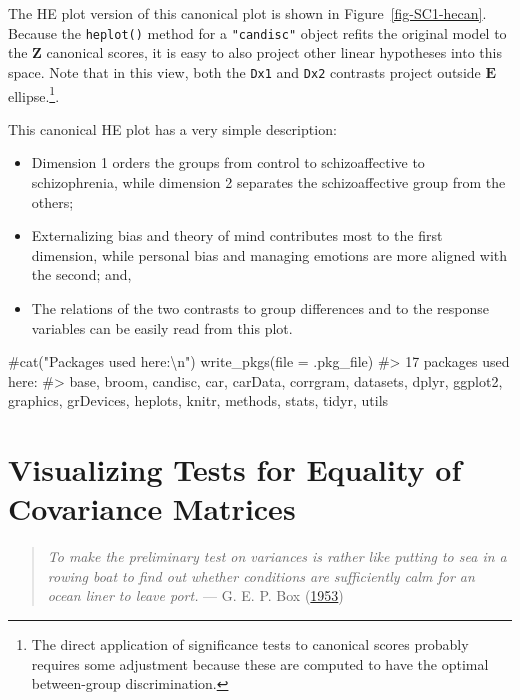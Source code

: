 \documentclass[
  letterpaper,
  10pt,
  krantz2]{krantz}
\makeatletter
\newenvironment{Shaded}{\begin{snugshade}}{\end{snugshade}}
\newcommand{\AttributeTok}[1]{\textcolor[rgb]{0.40,0.45,0.13}{#1}}
\newcommand{\CommentTok}[1]{\textcolor[rgb]{0.37,0.37,0.37}{#1}}
\newcommand{\FunctionTok}[1]{\textcolor[rgb]{0.28,0.35,0.67}{#1}}
\newcommand{\NormalTok}[1]{\textcolor[rgb]{0.00,0.23,0.31}{#1}}
\providecommand{\tightlist}{%
  \setlength{\itemsep}{0pt}\setlength{\parskip}{0pt}}\usepackage{longtable,booktabs,array}
\newenvironment{kframe}{%
  \medskip{}
  \setlength{\fboxsep}{.8em}
  \def\at@end@of@kframe{}%
  \ifinner\ifhmode%
  \def\at@end@of@kframe{\end{minipage}}%
  \begin{minipage}{\columnwidth}%
  \fi\fi%
  \def\FrameCommand##1{\hskip\@totalleftmargin \hskip-\fboxsep
  \colorbox{shadecolor}{##1}\hskip-\fboxsep
      \hskip-\linewidth \hskip-\@totalleftmargin \hskip\columnwidth}%
  \MakeFramed {\advance\hsize-\width
    \@totalleftmargin\z@ \linewidth\hsize
    \@setminipage}}%
{\par\unskip\endMakeFramed%
  \at@end@of@kframe}
\renewenvironment{Shaded}{\begin{kframe}}{\end{kframe}}
\makeatother
\begin{document}
The HE plot version of this canonical plot is shown in
Figure~\ref{fig-SC1-hecan}. Because the \texttt{heplot()} method for a
\texttt{"candisc"} object refits the original model to the
\(\mathbf{Z}\) canonical scores, it is easy to also project other linear
hypotheses into this space. Note that in this view, both the
\texttt{Dx1} and \texttt{Dx2} contrasts project outside \(\mathbf{E}\)
ellipse.\footnote{The direct application of significance tests to
  canonical scores probably requires some adjustment because these are
  computed to have the optimal between-group discrimination.}.

This canonical HE plot has a very simple description:

\begin{itemize}
\tightlist
\item
  Dimension 1 orders the groups from control to schizoaffective to
  schizophrenia, while dimension 2 separates the schizoaffective group
  from the others;
\item
  Externalizing bias and theory of mind contributes most to the first
  dimension, while personal bias and managing emotions are more aligned
  with the second; and,
\item
  The relations of the two contrasts to group differences and to the
  response variables can be easily read from this plot.
\end{itemize}

\begin{Shaded}
\begin{Highlighting}[]
\CommentTok{\#cat("Packages used here:\textbackslash{}n")}
\FunctionTok{write\_pkgs}\NormalTok{(}\AttributeTok{file =}\NormalTok{ .pkg\_file)}
\CommentTok{\#\textgreater{} 17  packages used here:}
\CommentTok{\#\textgreater{}  base, broom, candisc, car, carData, corrgram, datasets, dplyr, ggplot2, graphics, grDevices, heplots, knitr, methods, stats, tidyr, utils}
\end{Highlighting}
\end{Shaded}


\hypertarget{sec-eqcov}{%
\chapter{Visualizing Tests for Equality of Covariance
Matrices}\label{sec-eqcov}}

\begin{quote}
\emph{To make the preliminary test on variances is rather like putting
to sea in a rowing boat to find out whether conditions are sufficiently
calm for an ocean liner to leave port.} --- G. E. P. Box
(\protect\hyperlink{ref-Box:1953}{1953})
\end{quote}
\end{document}

